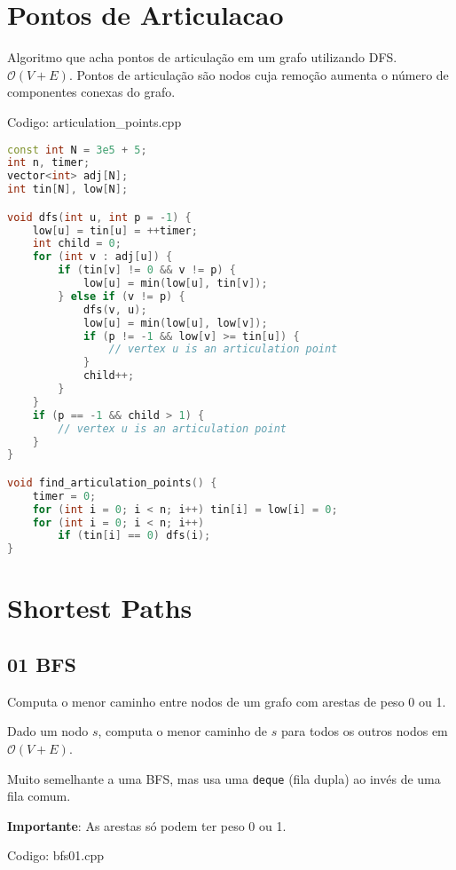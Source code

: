 \documentclass[10pt, a4paper, oneside]{book}
\begin{document}
\section{Pontos de Articulacao}


Algoritmo que acha pontos de articulação em um grafo utilizando DFS. $\mathcal{O}(V + E)$. Pontos de articulação são nodos cuja remoção aumenta o número de componentes conexas do grafo.
\hfill

Codigo: articulation\_points.cpp

\begin{lstlisting}[language=C++]
const int N = 3e5 + 5;
int n, timer;
vector<int> adj[N];
int tin[N], low[N];

void dfs(int u, int p = -1) {
    low[u] = tin[u] = ++timer;
    int child = 0;
    for (int v : adj[u]) {
        if (tin[v] != 0 && v != p) {
            low[u] = min(low[u], tin[v]);
        } else if (v != p) {
            dfs(v, u);
            low[u] = min(low[u], low[v]);
            if (p != -1 && low[v] >= tin[u]) {
                // vertex u is an articulation point
            }
            child++;
        }
    }
    if (p == -1 && child > 1) {
        // vertex u is an articulation point
    }
}

void find_articulation_points() {
    timer = 0;
    for (int i = 0; i < n; i++) tin[i] = low[i] = 0;
    for (int i = 0; i < n; i++)
        if (tin[i] == 0) dfs(i);
}
\end{lstlisting}
\hfill

\section{Shortest Paths}
\subsection{01 BFS}


Computa o menor caminho entre nodos de um grafo com arestas de peso 0 ou 1.



Dado um nodo $s$, computa o menor caminho de $s$ para todos os outros nodos em $\mathcal{O}(V + E)$.



Muito semelhante a uma BFS, mas usa uma \texttt{deque} (fila dupla) ao invés de uma fila comum.



\textbf{Importante}: As arestas só podem ter peso 0 ou 1.
\hfill

Codigo: bfs01.cpp
\end{document}
